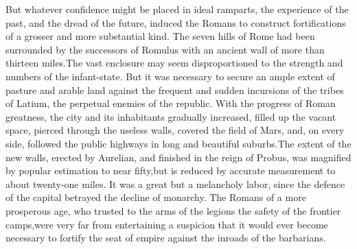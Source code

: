 But whatever confidence might be placed in ideal ramparts, the
experience of the past, and the dread of the future, induced the
Romans to construct fortifications of a grosser and more
substantial kind. The seven hills of Rome had been surrounded by
the successors of Romulus with an ancient wall of more than
thirteen miles.\footnotemark[40] The vast enclosure may seem disproportioned to
the strength and numbers of the infant-state. But it was
necessary to secure an ample extent of pasture and arable land
against the frequent and sudden incursions of the tribes of
Latium, the perpetual enemies of the republic. With the progress
of Roman greatness, the city and its inhabitants gradually
increased, filled up the vacant space, pierced through the
useless walls, covered the field of Mars, and, on every side,
followed the public highways in long and beautiful suburbs.\footnotemark[41]
The extent of the new walls, erected by Aurelian, and finished in
the reign of Probus, was magnified by popular estimation to near
fifty,\footnotemark[42] but is reduced by accurate measurement to about
twenty-one miles. \footnotemark[43] It was a great but a melancholy labor, since
the defence of the capital betrayed the decline of monarchy. The
Romans of a more prosperous age, who trusted to the arms of the
legions the safety of the frontier camps,\footnotemark[44] were very far from
entertaining a suspicion that it would ever become necessary to
fortify the seat of empire against the inroads of the barbarians.\footnotemark[45]





